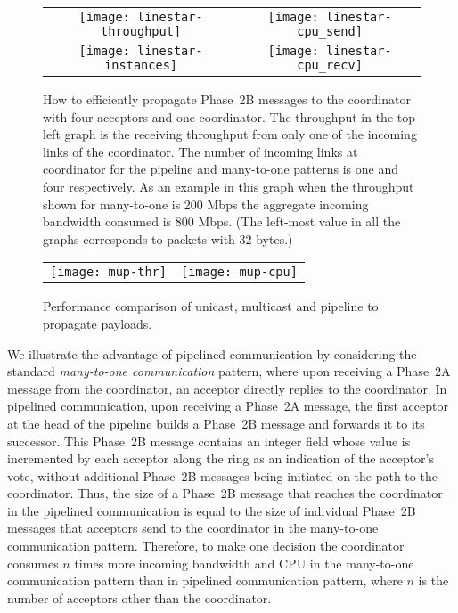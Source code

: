 \documentclass[final,3p,times,twocolumn,authoryear]{elsarticle}
\begin{document}
\begin{figure*}[ht]
 \begin{center}
\begin{tabular}{c@{}c}
	 \texttt{[image: linestar-throughput]} &
	 \texttt{[image: linestar-cpu\_send]}\\
           \texttt{[image: linestar-instances]} &
           \texttt{[image: linestar-cpu\_recv]} \\
\end{tabular}      
\caption{How to efficiently propagate Phase~2B messages to the coordinator with four acceptors and one coordinator. The throughput in the top left graph is the receiving throughput from only one of the incoming links of the coordinator. The number of incoming links at coordinator for the pipeline and many-to-one patterns is one and four respectively. As an example in this graph when the throughput shown for many-to-one is 200 Mbps the aggregate incoming bandwidth consumed is 800 Mbps. (The left-most value in all the graphs corresponds to packets with 32 bytes.) }
\label{fig:obs1}
\end{center}
\end{figure*}


\begin{figure*}
 \begin{center}
  	\begin{tabular}{c@{}c}
      \texttt{[image: mup-thr]} &
       \texttt{[image: mup-cpu]} \\
       \end{tabular}
     \caption{Performance comparison of unicast, multicast and pipeline to propagate payloads.}
     \label{fig:obs2}
\end{center}
\end{figure*}



We illustrate the advantage of pipelined communication by considering the standard {\it many-to-one communication} pattern, where upon receiving a Phase~2A message from the coordinator, an acceptor directly replies to the coordinator.
In pipelined communication, upon receiving a Phase~2A message, the first acceptor at the head of the pipeline builds a Phase~2B message and forwards it to its successor. 
This Phase~2B message contains an integer field whose value is incremented by each acceptor along the ring as an indication of the acceptor's vote, without additional Phase~2B messages being initiated on the path to the coordinator. 
Thus, the size of a Phase~2B message that reaches the coordinator in the pipelined communication is equal to the size of individual Phase~2B messages that acceptors send to the coordinator in the many-to-one communication pattern. 
Therefore, to make one decision the coordinator consumes $n$ times more incoming bandwidth and CPU in the many-to-one communication pattern than in pipelined communication pattern, where $n$ is the number of acceptors other than the coordinator. 
\end{document}
